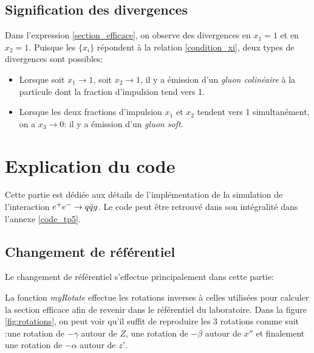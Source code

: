 \documentclass[a4paper]{article} %
\numberwithin{equation}{section} %
\theoremstyle{definition}
\theoremstyle{remark}
\theoremstyle{plain}%
\theoremstyle{style_exemple}
\begin{document}
\subsection{Signification des divergences}
Dans l'expression \eqref{section_efficace}, on observe des divergences en $x_1 = 1$ et en $x_2 = 1$. Puisque les $\{ x_i \}$ répondent à la relation \eqref{condition_xi}, deux types de divergences sont possibles:%
\begin{itemize}
    \item Lorsque soit $x_1 \rightarrow 1$, soit $x_2 \rightarrow 1$, il y a émission d'un \textit{gluon colinéaire} à la particule dont la fraction d'impulsion tend vers 1.
    \item Lorsque les deux fractions d'impulsion $x_1$ et $x_2$ tendent vers 1 simultanément, on a $x_3 \rightarrow 0$: il y a émission d'un \textit{gluon soft}.
\end{itemize}

\newpage
\section{Explication du code}
Cette partie est dédiée aux détails de l'implémentation de la simulation de l'interaction $e^+e^- \rightarrow  q \Bar{q} g$. Le code peut être retrouvé dans son intégralité dans l'annexe \ref{code_tp5}.


\subsection{Changement de référentiel}
Le changement de référentiel s'effectue principalement dans cette partie:

La fonction \textit{myRotate} effectue les rotations inverses à celles utilisées pour calculer la section efficace afin de revenir dans le référentiel du laboratoire. Dans la figure \ref{fig:rotations}, on peut voir qu'il suffit de reproduire les 3 rotations comme suit :une rotation de $-\gamma$ autour de $Z$, une rotation de $-\beta$ autour de $x''$ et finalement une rotation de $-\alpha$ autour de $z'$.
\end{document}
